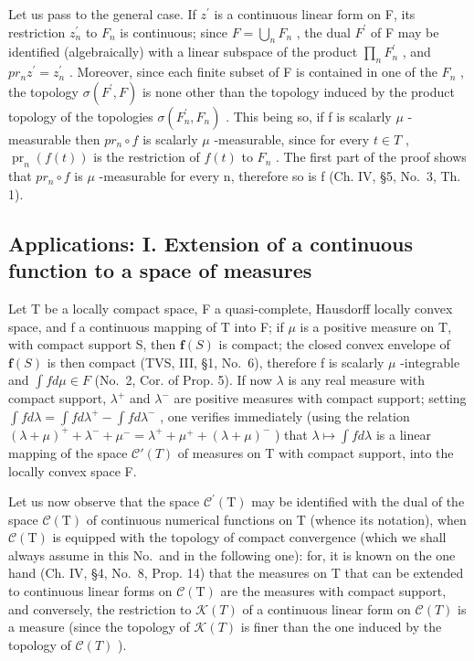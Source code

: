 Let us pass to the general case. If \(z^{\prime}\) is a continuous linear form on F, its restriction \(z_{n}^{\prime}\) to \(F_{n}\) is continuous; since \(F = \bigcup_{n} F_{n}\) , the dual \(F^{\prime}\) of F may be identified (algebraically) with a linear subspace of the product \(\prod_{n} F_{n}^{\prime}\) , and \(pr_{n}z^{\prime} = z_{n}^{\prime}\) . Moreover, since each finite subset of F is contained in one of the \(F_{n}\) , the topology \(\sigma(F^{\prime}, F)\) is none other than the topology induced by the product topology of the topologies \(\sigma(F_{n}^{\prime}, F_{n})\) . This being so, if f is scalarly \(\mu\) -measurable then \(pr_{n} \circ f\) is scalarly \(\mu\) -measurable, since for every \(t \in T\) , \(\operatorname{pr}_{n}(f(t))\) is the restriction of \(f(t)\) to \(F_{n}\) . The first part of the proof shows that \(pr_{n} \circ f\) is \(\mu\) -measurable for every n, therefore so is f (Ch. IV, §5, No.~3, Th. 1).

\subsection{Applications: I. Extension of a continuous function to a space of measures}

Let T be a locally compact space, F a quasi-complete, Hausdorff locally convex space, and f a continuous mapping of T into F; if \(\mu\) is a positive measure on T, with compact support S, then \(\mathbf{f}(S)\) is compact; the closed convex envelope of \(\mathbf{f}(S)\) is then compact (TVS, III, §1, No.~6), therefore f is scalarly \(\mu\) -integrable and \(\int f d\mu \in F\) (No.~2, Cor. of Prop. 5). If now \(\lambda\) is any real measure with compact support, \(\lambda^{+}\) and \(\lambda^{-}\) are positive measures with compact support; setting \(\int f d\lambda = \int f d\lambda^{+} - \int f d\lambda^{-}\) , one verifies immediately (using the relation \((\lambda + \mu)^{+} + \lambda^{-} + \mu^{-} = \lambda^{+} + \mu^{+} + (\lambda + \mu)^{-}\) ) that \(\lambda \mapsto \int f d\lambda\) is a linear mapping of the space \(\mathcal{C}'(T)\) of measures on T with compact support, into the locally convex space F.

Let us now observe that the space \(\mathcal{C}^{\prime}(\mathrm{T})\) may be identified with the dual of the space \(\mathcal{C}(\mathrm{T})\) of continuous numerical functions on T (whence its notation), when \(\mathcal{C}(\mathrm{T})\) is equipped with the topology of compact convergence (which we shall always assume in this No.~and in the following one): for, it is known on the one hand (Ch. IV, §4, No.~8, Prop. 14) that the measures on T that can be extended to continuous linear forms on \(\mathcal{C}(\mathrm{T})\) are the measures with compact support, and conversely, the restriction to \(\mathcal{K}(T)\) of a continuous linear form on \(\mathcal{C}(T)\) is a measure (since the topology of \(\mathcal{K}(T)\) is finer than the one induced by the topology of \(\mathcal{C}(T)\) ).

